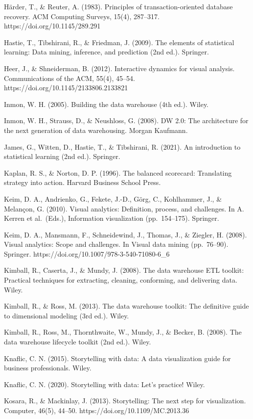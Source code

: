 Härder, T., \& Reuter, A. (1983). Principles of transaction-oriented database recovery. ACM Computing Surveys, 15(4), 287–317. https://doi.org/10.1145/289.291

Hastie, T., Tibshirani, R., \& Friedman, J. (2009). The elements of statistical learning: Data mining, inference, and prediction (2nd ed.). Springer.

Heer, J., \& Shneiderman, B. (2012). Interactive dynamics for visual analysis. Communications of the ACM, 55(4), 45–54. https://doi.org/10.1145/2133806.2133821

Inmon, W. H. (2005). Building the data warehouse (4th ed.). Wiley.

Inmon, W. H., Strauss, D., \& Neushloss, G. (2008). DW 2.0: The architecture for the next generation of data warehousing. Morgan Kaufmann.

James, G., Witten, D., Hastie, T., \& Tibshirani, R. (2021). An introduction to statistical learning (2nd ed.). Springer.

Kaplan, R. S., \& Norton, D. P. (1996). The balanced scorecard: Translating strategy into action. Harvard Business School Press.

Keim, D. A., Andrienko, G., Fekete, J.-D., Görg, C., Kohlhammer, J., \& Melançon, G. (2010). Visual analytics: Definition, process, and challenges. In A. Kerren et al. (Eds.), Information visualization (pp. 154–175). Springer.

Keim, D. A., Mansmann, F., Schneidewind, J., Thomas, J., \& Ziegler, H. (2008). Visual analytics: Scope and challenges. In Visual data mining (pp. 76–90). Springer. https://doi.org/10.1007/978-3-540-71080-6\_6

Kimball, R., Caserta, J., \& Mundy, J. (2008). The data warehouse ETL toolkit: Practical techniques for extracting, cleaning, conforming, and delivering data. Wiley.

Kimball, R., \& Ross, M. (2013). The data warehouse toolkit: The definitive guide to dimensional modeling (3rd ed.). Wiley.

Kimball, R., Ross, M., Thornthwaite, W., Mundy, J., \& Becker, B. (2008). The data warehouse lifecycle toolkit (2nd ed.). Wiley.

Knaflic, C. N. (2015). Storytelling with data: A data visualization guide for business professionals. Wiley.

Knaflic, C. N. (2020). Storytelling with data: Let’s practice! Wiley.

Kosara, R., \& Mackinlay, J. (2013). Storytelling: The next step for visualization. Computer, 46(5), 44–50. https://doi.org/10.1109/MC.2013.36

